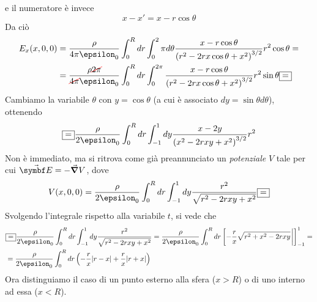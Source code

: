 e il numeratore è invece
\begin{equation*}
	x-x'=x-r\cos\theta
\end{equation*}
Da ciò 
\begin{align*}
	E_x(x,0,0)&=\frac{\rho}{4\pi\epsilon_0}\int_0^Rdr\int_0^2\pi d\theta \frac{x-r\cos\theta}{\left(r^2-2rx\cos\theta+x^2\right)^{3/2}}r^2\cos\theta=\\
	&=\frac{\rho \Ccancel[red]{2\pi}}{\Ccancel[red]{4\pi}\epsilon_0}\int_0^Rdr\int_{0}^{2\pi}\frac{x-r\cos\theta}{\left(r^2-2rx\cos\theta+x^2\right)^{3/2}}r^2\sin\theta\squarequal
\end{align*}
Cambiamo la variabile $\theta$ con $y=\cos\theta$ (a cui è associato $dy=\sin\theta d\theta$), ottenendo
\begin{equation*}
	\squarequal\frac{\rho}{2\epsilon_0}\int_0^Rdr\int_{-1}^{1}dy\frac{x-2y}{\left(x^2-2rxy+x^2\right)^{3/2}}r^2
\end{equation*}
Non è immediato, ma si ritrova come già preannunciato un \textit{potenziale} $V$ tale per cui $\vba{E}=-\grad{V}$, dove
\begin{equation*}
	V(x,0,0)=\frac{\rho}{2\epsilon_0}\int_{0}^Rdr\int_{-1}^{1}dy\frac{r^2}{\sqrt{r^2-2rxy+x^2}}\squarequal
\end{equation*}
Svolgendo l'integrale rispetto alla variabile $t$, si vede che
\begin{align*}
	&\squarequal\frac{\rho}{2\epsilon_0}\int_{0}^Rdr\int_{-1}^{1}dy\frac{r^2}{\sqrt{r^2-2rxy+x^2}}=\frac{\rho}{2\epsilon_0}\int_{0}^Rdr\left[-\frac{r}{x}\sqrt{r^2+x^2-2rxy}\eval\right]_{-1}^{1}=\\
	&=\frac{\rho}{2\epsilon_0}\int_{0}^Rdr\left(-\frac{r}{x}\abs{r-x}+\frac{r}{x}\abs{r+x}\right)
\end{align*}
Ora distinguiamo il caso di un punto esterno alla sfera ($x>R$) o di uno interno ad essa ($x<R$).
